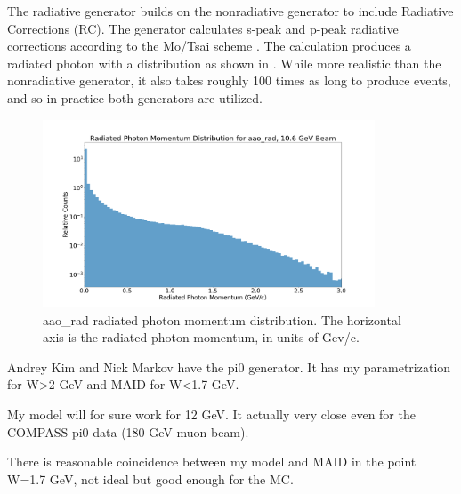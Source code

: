 The radiative generator builds on the nonradiative generator to include Radiative Corrections (RC). The generator calculates s-peak and p-peak radiative corrections according to the Mo/Tsai scheme \parencite{MO1969RadiativeScattering}. The calculation produces a radiated photon with a distribution as shown in . While more realistic than the nonradiative generator, it also takes roughly 100 times as long to produce events, and so in practice both generators are utilized. 


    \begin{figure}
        \centering
        \includegraphics[trim={2cm 1.25cm 2cm 2.5cm},clip,width=0.879\textwidth]{Chapters/Ch3-Simulations/event_generation/pics/radiated_photon_momentum.png}
        \caption[aao\_rad radiated photon momentum distribution]{aao\_rad radiated photon momentum distribution. The horizontal axis is the radiated photon momentum, in units of Gev/c.}
        \label{fig:aao_rad_mom_distribution}
    \end{figure}
    
    

\iffalse
Andrey Kim and Nick Markov have the pi0 generator. It has my parametrization for W>2 GeV and MAID for W<1.7 GeV.

My model will for sure work for 12 GeV. It actually very close even for the COMPASS pi0 data (180 GeV muon beam).

There is reasonable coincidence between my model and MAID in the point W=1.7 GeV, not ideal but good enough for the MC.

